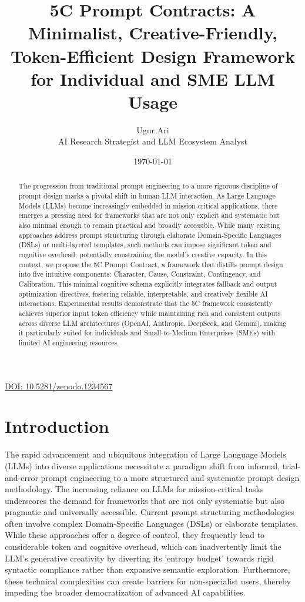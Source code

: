\documentclass[10pt, a4paper]{article}
\title{5C Prompt Contracts: A Minimalist, Creative-Friendly, Token-Efficient Design Framework for Individual and SME LLM Usage}
\author{Ugur Ari \\ AI Research Strategist and LLM Ecosystem Analyst} %
\date{\today}
\begin{document}
\maketitle

\href{https://doi.org/10.5281/zenodo.1234567}{DOI: 10.5281/zenodo.1234567}

\begin{abstract}
The progression from traditional prompt engineering to a more rigorous discipline of prompt design marks a pivotal shift in human-LLM interaction. As Large Language Models (LLMs) become increasingly embedded in mission-critical applications, there emerges a pressing need for frameworks that are not only explicit and systematic but also minimal enough to remain practical and broadly accessible. While many existing approaches address prompt structuring through elaborate Domain-Specific Languages (DSLs) or multi-layered templates, such methods can impose significant token and cognitive overhead, potentially constraining the model's creative capacity. In this context, we propose the 5C Prompt Contract, a framework that distills prompt design into five intuitive components: Character, Cause, Constraint, Contingency, and Calibration. This minimal cognitive schema explicitly integrates fallback and output optimization directives, fostering reliable, interpretable, and creatively flexible AI interactions. Experimental results demonstrate that the 5C framework consistently achieves superior input token efficiency while maintaining rich and consistent outputs across diverse LLM architectures (OpenAI, Anthropic, DeepSeek, and Gemini), making it particularly suited for individuals and Small-to-Medium Enterprises (SMEs) with limited AI engineering resources.
\end{abstract}

\section{Introduction}
The rapid advancement and ubiquitous integration of Large Language Models (LLMs) into diverse applications necessitate a paradigm shift from informal, trial-and-error prompt engineering to a more structured and systematic prompt design methodology. The increasing reliance on LLMs for mission-critical tasks underscores the demand for frameworks that are not only systematic but also pragmatic and universally accessible. Current prompt structuring methodologies often involve complex Domain-Specific Languages (DSLs) or elaborate templates. While these approaches offer a degree of control, they frequently lead to considerable token and cognitive overhead, which can inadvertently limit the LLM's generative creativity by diverting its 'entropy budget' towards rigid syntactic compliance rather than expansive semantic exploration. Furthermore, these technical complexities can create barriers for non-specialist users, thereby impeding the broader democratization of advanced AI capabilities.
\end{document}
